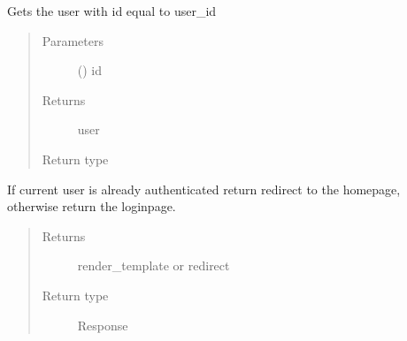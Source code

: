 \documentclass[letterpaper,10pt,english]{sphinxmanual}
\begin{document}

\begin{fulllineitems}
\label{\detokenize{index:view.login.load_user}}
Gets the user with id equal to user\_id
\begin{quote}\begin{description}
\item[{Parameters}] \leavevmode
{} () \textendash{} id

\item[{Returns}] \leavevmode
user

\item[{Return type}] \leavevmode
{\hyperref[\detokenize{index:model.gio_db.User}]{}}

\end{description}\end{quote}

\end{fulllineitems}


\begin{fulllineitems}
\label{\detokenize{index:view.login.login}}
If current user is already authenticated return redirect to the homepage,
otherwise return the loginpage.
\begin{quote}\begin{description}
\item[{Returns}] \leavevmode
render\_template or redirect

\item[{Return type}] \leavevmode
Response

\end{description}\end{quote}

\end{fulllineitems}

\end{document}
